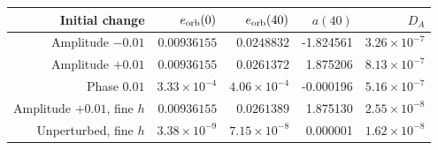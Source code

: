 \begin{tabular}{rrrrr}
\toprule
Initial change & $e_{\rm orb}(0)$ & $e_{\rm orb}(40)$ & $a(40)$ & $D_A$ \\
\midrule
Amplitude $-0.01$ & $0.00936155$ & $0.0248832$ & -1.824561 & $3.26\times10^{-7}$ \\
Amplitude $+0.01$ & $0.00936155$ & $0.0261372$ & 1.875206 & $8.13\times10^{-7}$ \\
Phase $0.01$ & $3.33\times10^{-4}$ & $4.06\times10^{-4}$ & -0.000196 & $5.16\times10^{-7}$ \\
Amplitude $+0.01$, fine $h$ & $0.00936155$ & $0.0261389$ & 1.875130 & $2.55\times10^{-8}$ \\
Unperturbed, fine $h$ & $3.38\times10^{-9}$ & $7.15\times10^{-8}$ & 0.000001 & $1.62\times10^{-8}$ \\
\bottomrule
\end{tabular}
